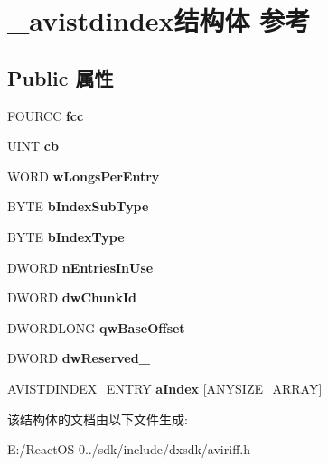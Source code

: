 \hypertarget{struct__avistdindex}{}\section{\+\_\+avistdindex结构体 参考}
\label{struct__avistdindex}
\subsection*{Public 属性}
\begin{DoxyCompactItemize}
\item 
\mbox{\label{struct__avistdindex_a7b9087109fb4b2261f6d1784c4f548a3}} 
F\+O\+U\+R\+CC {\bfseries fcc}
\item 
\mbox{\label{struct__avistdindex_ad4d089519e840e2464de98a8c57a65c4}} 
U\+I\+NT {\bfseries cb}
\item 
\mbox{\label{struct__avistdindex_adae85375d5ca3e336545fdd6cb1e602e}} 
W\+O\+RD {\bfseries w\+Longs\+Per\+Entry}
\item 
\mbox{\label{struct__avistdindex_a881b1bb4264f6b5d3347a3852e719928}} 
B\+Y\+TE {\bfseries b\+Index\+Sub\+Type}
\item 
\mbox{\label{struct__avistdindex_a22204784794d425be11392b84a260ab4}} 
B\+Y\+TE {\bfseries b\+Index\+Type}
\item 
\mbox{\label{struct__avistdindex_a1659d39ee4f91c4b520f8e8ca6e0a079}} 
D\+W\+O\+RD {\bfseries n\+Entries\+In\+Use}
\item 
\mbox{\label{struct__avistdindex_a41aa0b5e7bbd7182c61e18de6edb5b38}} 
D\+W\+O\+RD {\bfseries dw\+Chunk\+Id}
\item 
\mbox{\label{struct__avistdindex_adb17cc3173a4c5845ca2c21b5230abd2}} 
D\+W\+O\+R\+D\+L\+O\+NG {\bfseries qw\+Base\+Offset}
\item 
\mbox{\label{struct__avistdindex_a54b987328791bd0b44464300e7a80ec0}} 
D\+W\+O\+RD {\bfseries dw\+Reserved\+\_}
\item 
\mbox{\label{struct__avistdindex_ac89c0c138af1e35e495f41a5f0d2efca}} 
\hyperlink{struct__avistdindex__entry}{A\+V\+I\+S\+T\+D\+I\+N\+D\+E\+X\+\_\+\+E\+N\+T\+RY} {\bfseries a\+Index} \mbox{[}A\+N\+Y\+S\+I\+Z\+E\+\_\+\+A\+R\+R\+AY\mbox{]}
\end{DoxyCompactItemize}


该结构体的文档由以下文件生成\+:\begin{DoxyCompactItemize}
\item 
E\+:/\+React\+O\+S-\/0../sdk/include/dxsdk/aviriff.\+h\end{DoxyCompactItemize}

